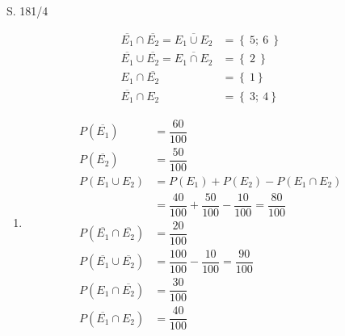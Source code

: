 \begin{Exercise}{S. 181/4}{}
\begin{enumerate}[leftmargin=*]
{\begin{enumerate}[label=\alph*),leftmargin=*]
\begin{minipage}[t]{0.45\linewidth}
\begin{enumerate}[label=\alph*),leftmargin=*]
{\begin{align*}
                        \overline{E_{1}} \cap \overline{E_{2}} = \overline{E_{1} \cup E_{2}} &= \left\{ \ 5; \ 6 \ \right\} &&\\[1.5ex]
                        \overline{E_{1}} \cup \overline{E_{2}} = \overline{E_{1} \cap E_{2}} &= \left\{ \ 2 \ \right\} &&\\[1.5ex]
                        E_{1} \cap \overline{E_{2}} &= \left\{ \ 1 \right\} &&\\[1.5ex]
                        \overline{E_{1}} \cap E_{2} &= \left\{ \ 3; \ 4 \right\}
                    \end{align*}
                    }
            \end{enumerate}
        \end{minipage}
        \begin{minipage}[t]{0.45\linewidth}
            \begin{enumerate}[label=\alph*),leftmargin=*]
                \item[c)] {
                    \begin{align*}
                        P(\overline{E_{1}}) &= \dfrac{60}{100} &&\\[1.5ex]
                        P(\overline{E_{2}}) &= \dfrac{50}{100} &&\\[1.5ex]
                        P(E_{1} \cup E_{2}) &= P(E_{1}) + P(E_{2}) - P(E_{1} \cap E_{2}) &&\\[1.5ex]
                        &= \dfrac{40}{100} + \dfrac{50}{100} - \dfrac{10}{100} = \dfrac{80}{100} &&\\[1.5ex]
                        P(\overline{E_{1}} \cap \overline{E_{2}}) &= \dfrac{20}{100} &&\\[1.5ex]
                        P(\overline{E_{1}} \cup \overline{E_{2}}) &= \dfrac{100}{100} - \dfrac{10}{100} = \dfrac{90}{100} &&\\[1.5ex]
                        P(E_{1} \cap \overline{E_{2}}) &= \dfrac{30}{100} &&\\[1.5ex]
                        P(\overline{E_{1}} \cap E_{2}) &= \dfrac{40}{100}
                    \end{align*}
                }
            \end{enumerate}
        \end{minipage}
        \end{enumerate}
        }
\end{enumerate}
\end{Exercise}


